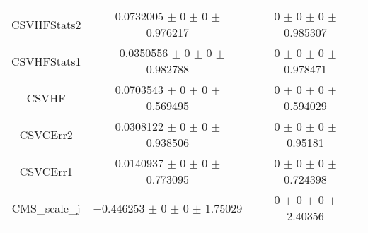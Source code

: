 \begin{table}
\begin{tabular}{ccc}
CSVHFStats2 	& \num{0.0732005} $\pm$ \num{0} $\pm$ \num{0} $\pm$ \num{0.976217} 	& \num{0} $\pm$ \num{0} $\pm$ \num{0} $\pm$ \num{0.985307}\\
CSVHFStats1 	& \num{-0.0350556} $\pm$ \num{0} $\pm$ \num{0} $\pm$ \num{0.982788} 	& \num{0} $\pm$ \num{0} $\pm$ \num{0} $\pm$ \num{0.978471}\\
CSVHF 	& \num{0.0703543} $\pm$ \num{0} $\pm$ \num{0} $\pm$ \num{0.569495} 	& \num{0} $\pm$ \num{0} $\pm$ \num{0} $\pm$ \num{0.594029}\\
CSVCErr2 	& \num{0.0308122} $\pm$ \num{0} $\pm$ \num{0} $\pm$ \num{0.938506} 	& \num{0} $\pm$ \num{0} $\pm$ \num{0} $\pm$ \num{0.95181}\\
CSVCErr1 	& \num{0.0140937} $\pm$ \num{0} $\pm$ \num{0} $\pm$ \num{0.773095} 	& \num{0} $\pm$ \num{0} $\pm$ \num{0} $\pm$ \num{0.724398}\\
CMS\_scale\_j 	& \num{-0.446253} $\pm$ \num{0} $\pm$ \num{0} $\pm$ \num{1.75029} 	& \num{0} $\pm$ \num{0} $\pm$ \num{0} $\pm$ \num{2.40356}\\
\bottomrule
\end{tabular}
\end{table}